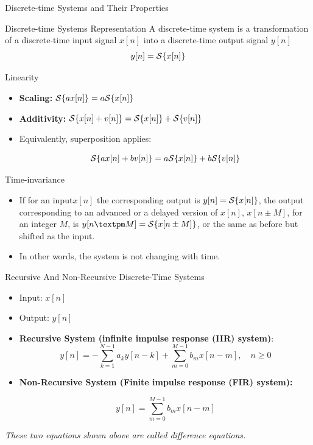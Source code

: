 \documentclass[aspectratio=169,xcolor=dvipsnames,svgnames,x11names,fleqn]{beamer}
\begin{document}

\begin{frame}{}
    \begin{center}
    \Huge \bf \color{DarkBlue}
    \faObjectUngroup
    
    Discrete-time Systems and Their Properties
\end{center}
\end{frame}

\begin{frame}{Discrete-time Systems Representation}
    A discrete-time system is a transformation of a discrete-time input signal $x[n]$ into a discrete-time output signal $y[n]$
\Large
    $$
    y[n] = {\mathcal S}\{x[n]\}
    $$
\end{frame}

\begin{frame}{Linearity}
    \begin{itemize}
        \item \textbf{Scaling:} ${\mathcal S}\{ax[n]\} = a{\mathcal S}\{x[n]\}$
        \item \textbf{Additivity:} ${\mathcal S}\{x[n] + v[n] \} = {\mathcal S}\{x[n]\}+ {\mathcal S}\{v[n]\} $

        \item Equivalently, superposition applies:

        $$
        {\mathcal S}\{ax[n] + bv[n] \} = a{\mathcal S}\{x[n]\}+ b{\mathcal S}\{v[n]\} 
        $$
    \end{itemize}
\end{frame}

\begin{frame}{Time-invariance}
    \begin{itemize}
        \item If for an input$ x[n]$ the corresponding output is $y[n] ={\mathcal S}\{x[n]\}$, the output corresponding to an advanced or a delayed version of $x[n]$, $x[n \pm M]$, for an integer $M$, is $y[n ± M] = \Scal\{x[n \pm M]\}$, or the same as before but shifted as the input. 
        \item In other words, the system is not changing with time.
    \end{itemize}
\end{frame}

\begin{frame}{Recursive And Non-Recursive Discrete-Time Systems}

\begin{itemize}
    \item Input: $x[n]$
    \item Output: $y[n]$
    \item \textbf{Recursive System (infinite impulse response (IIR) system)}:
    $$
    y[n] = -\sum_{k=1}^{N-1}a_k y[n-k] + \sum_{m=0}^{M-1}b_m x[n-m], \quad n\geq 0
    $$    
    \item \textbf{Non-Recursive System (Finite impulse response (FIR) system):}

    $$
    y[n] = \sum_{m=0}^{M-1}b_m x[n-m]
    $$
\end{itemize}
\textit{These two equations shown above are called difference equations.}

\end{frame}
\end{document}
